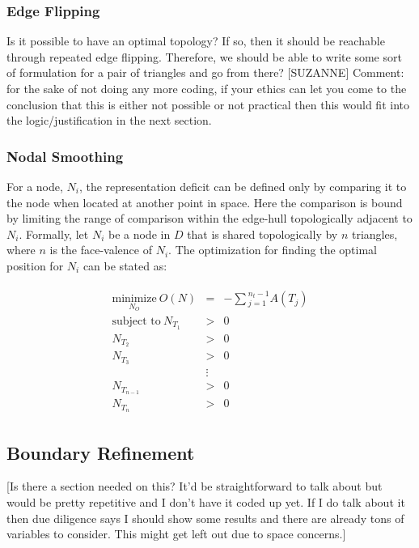 \subsubsection{Edge Flipping}
Is it possible to have an optimal topology? If so, then it should be
reachable through repeated edge flipping. Therefore, we should be able
to write some sort of formulation for a pair of triangles and go from
there? [SUZANNE] Comment: for the sake of not doing any more coding, if
your ethics can let you come to the conclusion that this is either not
possible or not practical then this would fit into the
logic/justification in the next section.

\subsubsection{Nodal Smoothing}
For a node, $N_i$, the representation deficit can be defined only by
comparing it to the node when located at another point in space. Here
the comparison is bound by limiting the range of comparison within the
edge-hull topologically adjacent to $N_i$. Formally, let $N_i$ be a node
in $D$ that is shared topologically by $n$ triangles, where $n$ is the
face-valence of $N_i$. The optimization for finding the optimal position
for $N_i$ can be stated as:

\begin{eqnarray*}
\begin{array}{rcl}
\underset{N_O}{\text{minimize}} \ O(N) & = &
-\sum{_{j=1}^{n_t-1}A\left(T_j\right)} \\
\text{subject to} \ N_{T_1} & > & 0 \\
N_{T_2} & > & 0 \\ 
N_{T_3} & > & 0 \\
& \vdots & \\
N_{T_{n-1}} & > & 0 \\ 
N_{T_n} & > & 0
\end{array}
\end{eqnarray*}

\subsection{Boundary Refinement}
[Is there a section needed on this? It'd be straightforward to talk about
but would be pretty repetitive and I don't have it coded up yet. If I do
talk about it then due diligence says I should show some results and
there are already tons of variables to consider. This might get left out
due to space concerns.]
